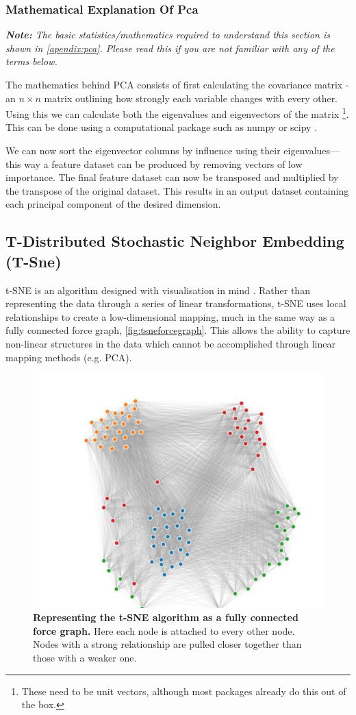 \subsubsection{Mathematical Explanation Of Pca}
\emph{\textbf{Note:} The basic statistics/mathematics required to understand this section is shown in \autoref{apendix:pca}. Please read this if you are not familiar with any of the terms below.
}

The mathematics behind PCA consists of first calculating the covariance matrix - an $n \times n$ matrix outlining how strongly each variable changes with every other. Using this we can calculate both the eigenvalues and eigenvectors of the matrix \footnote{These need to be unit vectors, although most packages already do this out of the box.}. This can be done using a computational package such as numpy or scipy \citep{numpy,scipy}.

We can now sort the eigenvector columns by influence using their eigenvalues—this way a feature dataset can be produced by removing vectors of low importance. The final feature dataset can now be transposed and multiplied by the transpose of the original dataset. This results in an output dataset containing each principal component of the desired dimension.



\subsection{T-Distributed Stochastic Neighbor Embedding (T-Sne)}\label{sec:overcrowd}

t-SNE is an algorithm designed with visualisation in mind \citep{tsne}. Rather than representing the data through a series of linear transformations, t-SNE uses local relationships to create a low-dimensional mapping, much in the same way as a fully connected force graph, \autoref{fig:tsneforcegraph}. This allows the ability to capture non-linear structures in the data which cannot be accomplished through linear mapping methods (e.g. PCA).

\begin{figure}[H]
    \centering
    \includegraphics[width=.6\textwidth]{./4fig/tsneforcegraph.png}
    \caption{\textbf{Representing the t-SNE algorithm as a fully connected force graph.} Here each node is attached to every other node. Nodes with a strong relationship are pulled closer together than those with a weaker one.}
    \label{fig:tsneforcegraph}
\end{figure}



